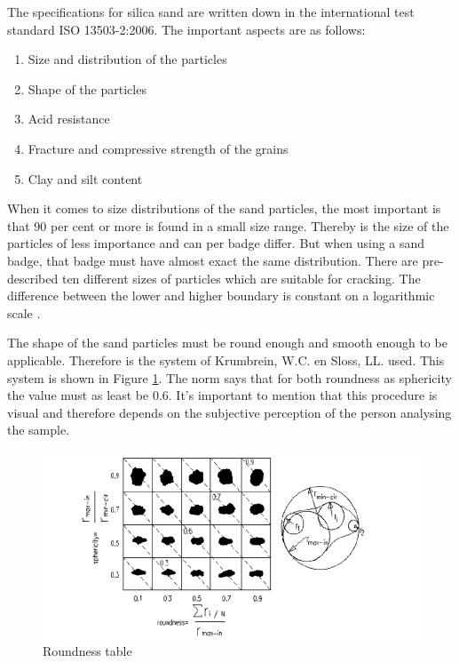 The specifications for silica sand are written down in the international test standard ISO 13503-2:2006. The important aspects are as follows:

\begin{enumerate}
    \item  Size and distribution of the particles
    \item Shape of the particles
    \item Acid resistance 
    \item Fracture and compressive strength of the grains
    \item Clay and silt content
\end{enumerate}

When it comes to size distributions of the sand particles, the most important is that 90 per cent or more is found in a small size range. Thereby is the size of the particles of less importance and can per badge differ. But when using a sand badge, that badge must have almost exact the same distribution. There are pre-described ten different sizes of particles which are suitable for cracking. The difference between the lower and higher boundary is constant on a logarithmic scale \autocite{bensonFracSandUnited2015}. 

The shape of the sand particles must be round enough and smooth enough to be applicable. Therefore is the system of Krumbrein, W.C. en Sloss, LL. used. This system is shown in Figure \ref{fig:RT}. The norm says that for both roundness as sphericity the value must as least be 0.6. It's important to mention that this procedure is visual and therefore depends on the subjective perception of the person analysing the sample.

\begin{figure}[H]
    \centering
    \includegraphics[width=0.75\linewidth]{figures//ch9/roundness.png}
    \caption{Roundness table \autocite{rodriguezParticleShapeQuantities2013}}
    \label{fig:RT}
\end{figure}

